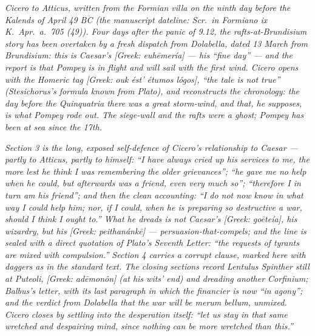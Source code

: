 
\textit{Cicero to Atticus, written from the Formian villa
on the ninth day before the Kalends of April 49 BC (the
manuscript dateline: \textit{Scr.\ in Formiano ix K.\ Apr.\
a.\ 705 (49)}). Four days after the panic of 9.12, the
rafts-at-Brundisium story has been overtaken by a fresh
dispatch from Dolabella, dated 13 March from Brundisium:
this is Caesar's \textit{[Greek: euh\=emer\'ia]} ---
his ``fine day'' --- and the report is that Pompey is
in flight and will sail with the first wind. Cicero
opens with the Homeric tag \textit{[Greek: ouk \'est'
\'etumos l\'ogos]}, ``the tale is not true'' (Stesichorus's
formula known from Plato), and reconstructs the
chronology: the day before the Quinquatria there was
a great storm-wind, and that, he supposes, is what
Pompey rode out. The siege-wall and the rafts were a
ghost; Pompey has been at sea since the 17th.}

\textit{Section 3 is the long, exposed self-defence of
Cicero's relationship to Caesar --- partly to Atticus,
partly to himself: ``I have always cried up his services
to me, the more lest he think I was remembering the
older grievances''; ``he gave me no help when he could,
but afterwards was a friend, even very much so'';
``therefore I in turn am his friend''; and then the
clean accounting: ``I do not now know in what way I
could help him; nor, if I could, when he is preparing
so destructive a war, should I think I ought to.'' What
he dreads is not Caesar's \textit{[Greek: go\=ete\'ia]},
his wizardry, but his \textit{[Greek: peithan\'ank\=e]} ---
persuasion-that-compels; and the line is sealed with a
direct quotation of Plato's \textit{Seventh Letter}:
``the requests of tyrants are mixed with compulsion.''
Section 4 carries a corrupt clause, marked here with
daggers as in the standard text. The closing sections
record Lentulus Spinther still at Puteoli, \textit{[Greek:
ad\=emon\^on]} (at his wits' end) and dreading another
Corfinium; Balbus's letter, with its last paragraph in
which the financier is now ``in agony''; and the verdict
from Dolabella that the war will be \textit{merum bellum},
unmixed. Cicero closes by settling into the desperation
itself: ``let us stay in that same wretched and
despairing mind, since nothing can be more wretched than
this.''}
